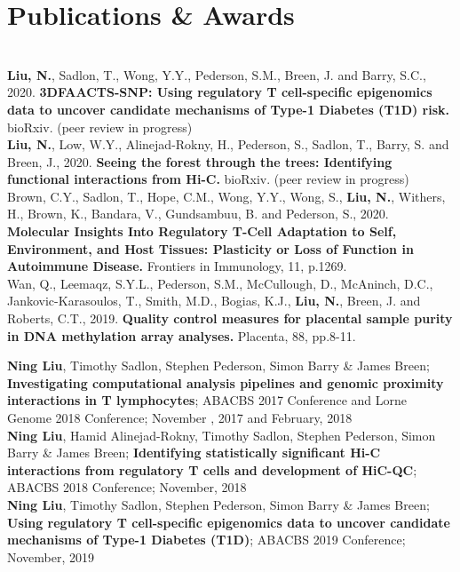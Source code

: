 \documentclass[]{deedy-resume-openfont}
\begin{document}

\section{Publications \& Awards}
\\
\textbf{Liu, N.}, Sadlon, T., Wong, Y.Y., Pederson, S.M., Breen, J. and Barry, S.C., 2020. \textbf{3DFAACTS-SNP: Using regulatory T cell-specific epigenomics data to uncover candidate mechanisms of Type-1 Diabetes (T1D) risk.} bioRxiv. (peer review in progress)\\ 
\textbf{Liu, N.}, Low, W.Y., Alinejad-Rokny, H., Pederson, S., Sadlon, T., Barry, S. and Breen, J., 2020. \textbf{Seeing the forest through the trees: Identifying functional interactions from Hi-C.} bioRxiv. (peer review in progress)\\
Brown, C.Y., Sadlon, T., Hope, C.M., Wong, Y.Y., Wong, S., \textbf{Liu, N.}, Withers, H., Brown, K., Bandara, V., Gundsambuu, B. and Pederson, S., 2020. \textbf{Molecular Insights Into Regulatory T-Cell Adaptation to Self, Environment, and Host Tissues: Plasticity or Loss of Function in Autoimmune Disease. }Frontiers in Immunology, 11, p.1269.\\
Wan, Q., Leemaqz, S.Y.L., Pederson, S.M., McCullough, D., McAninch, D.C., Jankovic-Karasoulos, T., Smith, M.D., Bogias, K.J., \textbf{Liu, N.}, Breen, J. and Roberts, C.T., 2019. \textbf{Quality control measures for placental sample purity in DNA methylation array analyses.} Placenta, 88, pp.8-11.\\

\sectionsep

\textbf{Ning Liu}, Timothy Sadlon, Stephen Pederson, Simon Barry \& James Breen; \textbf{Investigating computational analysis pipelines and genomic proximity interactions in T lymphocytes}; ABACBS 2017 Conference and Lorne Genome 2018 Conference; November , 2017 and February, 2018\\ 
\textbf{Ning Liu}, ‪Hamid Alinejad-Rokny, Timothy Sadlon, Stephen Pederson, Simon Barry \& James Breen; \textbf{Identifying statistically significant Hi-C interactions from regulatory T cells and development of HiC-QC}; ABACBS 2018 Conference; November, 2018\\ 
\textbf{Ning Liu}, Timothy Sadlon, Stephen Pederson, Simon Barry \& James Breen; \textbf{Using regulatory T cell-specific epigenomics data to uncover candidate mechanisms of Type-1 Diabetes (T1D)}; ABACBS 2019 Conference; November, 2019\\ 
\sectionsep
\end{document}

